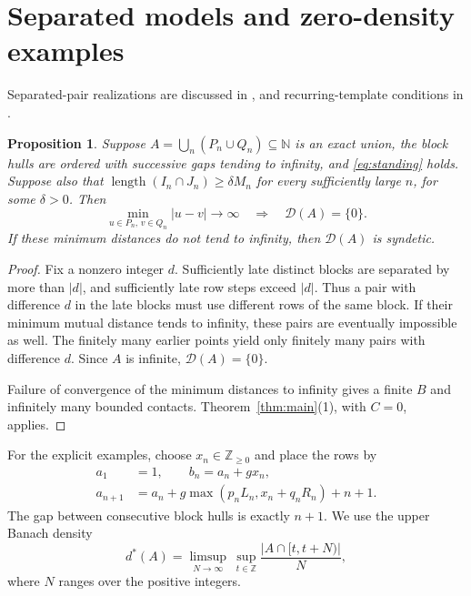 \documentclass[11pt,leqno]{amsart}
\numberwithin{equation}{section}
\newtheorem{proposition}[theorem]{Proposition}
\theoremstyle{definition}
\theoremstyle{remark}
\newcommand{\N}{\mathbb N}
\newcommand{\Z}{\mathbb Z}
\newcommand{\len}{\operatorname{length}}
\newcommand{\D}{\mathcal D}
\begin{document}
\section{Separated models and zero-density examples}

Separated-pair realizations are discussed in \cite{EPAD}, and recurring-template conditions in \cite{Botnet}.

\begin{proposition}\label{prop:separated}
Suppose $A=\bigcup_n(P_n\cup Q_n)\subseteq\N$ is an exact union, the block hulls are ordered with successive gaps tending to infinity, and \eqref{eq:standing} holds. Suppose also that $\len(I_n\cap J_n)\ge\delta M_n$ for every sufficiently large $n$, for some $\delta>0$. Then
\[
\min_{u\in P_n,\,v\in Q_n}|u-v|\longrightarrow\infty
\quad\Longrightarrow\quad \D(A)=\{0\}.
\]
If these minimum distances do not tend to infinity, then $\D(A)$ is syndetic.
\end{proposition}
\begin{proof}
Fix a nonzero integer $d$. Sufficiently late distinct blocks are separated by more than $|d|$, and sufficiently late row steps exceed $|d|$. Thus a pair with difference $d$ in the late blocks must use different rows of the same block. If their minimum mutual distance tends to infinity, these pairs are eventually impossible as well. The finitely many earlier points yield only finitely many pairs with difference $d$. Since $A$ is infinite, $\D(A)=\{0\}$.

Failure of convergence of the minimum distances to infinity gives a finite $B$ and infinitely many bounded contacts. Theorem~\ref{thm:main}(1), with $C=0$, applies.
\end{proof}

For the explicit examples, choose $x_n\in\Z_{\ge0}$ and place the rows by
\begin{equation}\label{eq:placement}
\begin{split}
a_1&=1,\qquad b_n=a_n+gx_n,\\
a_{n+1}&=a_n+g\max(p_nL_n,x_n+q_nR_n)+n+1.
\end{split}
\end{equation}
The gap between consecutive block hulls is exactly $n+1$.
We use the upper Banach density
\[
d^*(A)=\limsup_{N\to\infty}\ \sup_{t\in\Z}
\frac{|A\cap[t,t+N)|}{N},
\]
where $N$ ranges over the positive integers.
\end{document}
